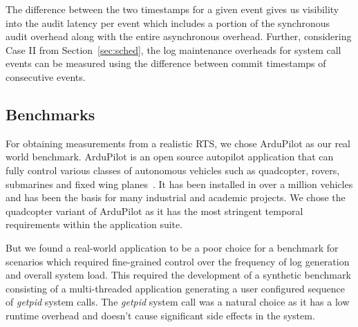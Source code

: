 The difference between the two timestamps for a given event gives us visibility into the audit latency per event which includes a portion of the synchronous audit overhead along with the entire asynchronous overhead. Further, considering Case II from Section~\ref{sec:sched}, the log maintenance overheads for system call events can be measured using the difference between commit timestamps of consecutive events.


\subsection{Benchmarks}
\label{sec:benchmarks}
For obtaining measurements from a realistic RTS, we chose ArduPilot as our real world benchmark. ArduPilot is an open source autopilot application that can fully control various classes of autonomous vehicles such as quadcopter, rovers, submarines and fixed wing planes~\cite{ardupilot}. It has been installed in over a million vehicles and has been the basis for many industrial and academic projects. We chose the quadcopter variant of ArduPilot as it has the most stringent temporal requirements within the application suite.

But we found a real-world application to be a poor choice for a benchmark for scenarios which required fine-grained control over the frequency of log generation and overall system load. This required the development of a synthetic benchmark consisting of a multi-threaded application generating a user configured sequence of \textit{getpid} system calls. The \textit{getpid} system call was a natural choice as it has a low runtime overhead and doesn't cause significant side effects in the system.







